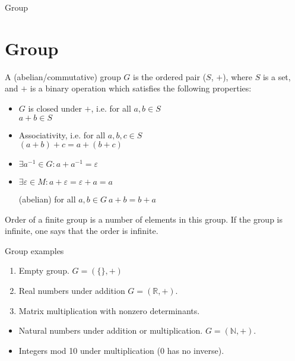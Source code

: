 \documentclass{beamer}
\begin{document}
\begin{frame}{Group}
	\section{Group}
	\begin{definition}
		A (abelian/commutative) group $G$ is the ordered pair ($S$, $+$), where $S$ is a set, and $+$ is a binary operation which satisfies the following properties:
		\begin{itemize}
			\item $G$ is closed under $+$, i.e. for all $a, b \in S$ \\
				$a + b \in S$
			\item Associativity, i.e. for all $a, b, c \in S$ \\
				$(a + b) + c = a + (b + c)$
			\item $\exists a^{-1} \in G : a + a^{-1} = \varepsilon$
			\item $\exists \varepsilon \in M : a + \varepsilon = \varepsilon + a = a$
			\item[(abelian)] for all $a, b \in G\ a + b = b + a$
		\end{itemize}
	\end{definition}
	\begin{definition}
		Order of a finite group is a number of elements in this group. If the group is infinite, one says that the order
		is infinite.
	\end{definition}
\end{frame}
	
\begin{frame}{Group examples}
	\begin{example}[Groups]
		\begin{enumerate}
			\item Empty group. $G = (\{\}, +)$
			\item Real numbers under addition $G = (\mathbb{R}, +)$.
			\item Matrix multiplication with nonzero determinants.
		\end{enumerate}
	\end{example}
	\begin{example}
		\begin{itemize}
			\item Natural numbers under addition or multiplication. $G = (\mathbb{N}, +)$.
			\item Integers mod 10 under multiplication (0 has no inverse).
		\end{itemize}
	\end{example}
\end{frame}
\end{document}
